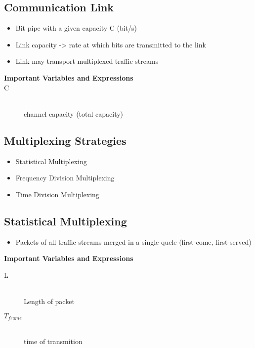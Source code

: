 \documentclass[../resumosRCOM.tex]{subfiles}
\begin{document}
 
\subsection{Communication Link}

\begin{itemize}
    \item Bit pipe with a given capacity C (bit/s)
    \item Link capacity -> rate at which bits are transmitted to the link
    \item Link may transport multiplexed traffic streams
\end{itemize}

\begin{description}
    \item [\textbf{Important Variables and Expressions}]
    \item[C] \hfill \\ channel capacity (total capacity)  
\end{description}

\subsection{Multiplexing Strategies}

\begin{itemize}
    \item Statistical Multiplexing
    \item Frequency Division Multiplexing
    \item Time Division Multiplexing
\end{itemize}

\subsection{Statistical Multiplexing}

\begin{itemize}
    \item Packets of all traffic streams merged in a single quele (first-come, first-served)
\end{itemize}

\textbf{Important Variables and Expressions}
\begin{description}
    \item[L] \hfill \\ Length of packet
    \item[\(T_{frame}\)] \hfill \\ time of transmition
\end{description}
\end{document}
